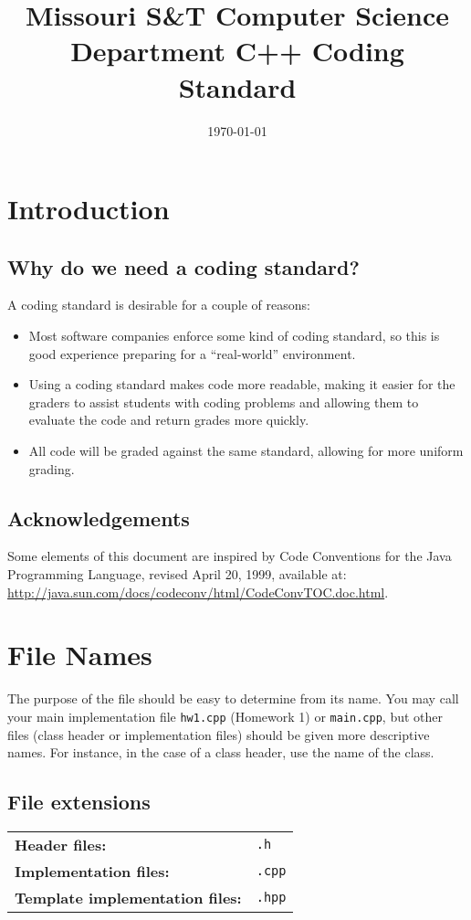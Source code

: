 \documentclass{article}
\title{Missouri S\&T Computer Science Department C++ Coding Standard}
\date{\today}
\newcommand{\code}[1]{\texttt{\colorbox{gray!30}{#1}}}
\begin{document}
\maketitle
\tableofcontents

\section{Introduction}
\subsection{Why do we need a coding standard?}
A coding standard is desirable for a couple of reasons:

\begin{itemize}
	\item Most software companies enforce some kind of coding standard, so this is good experience preparing for a ``real-world'' environment.
	\item Using a coding standard makes code more readable, making it easier for the graders to assist students with coding problems and allowing them to evaluate the code and return grades more quickly.
	\item All code will be graded against the same standard, allowing for more uniform grading.
\end{itemize}

\subsection{Acknowledgements}
Some elements of this document are inspired by Code Conventions for the Java\texttrademark{} Programming Language, revised April 20, 1999, available at: \url{http://java.sun.com/docs/codeconv/html/CodeConvTOC.doc.html}.

\section{File Names}
The purpose of the file should be easy to determine from its name.
You may call your main implementation file \code{hw1.cpp} (Homework 1) or \code{main.cpp}, but other files (class header or implementation files) should be given more descriptive names.
For instance, in the case of a class header, use the name of the class.

\subsection{File extensions}
\begin{tabular}{ll}
	\textbf{Header files:} & \code{.h} \\
	\textbf{Implementation files:} & \code{.cpp} \\
	\textbf{Template implementation files:} & \code{.hpp} \\
\end{tabular}
\end{document}
